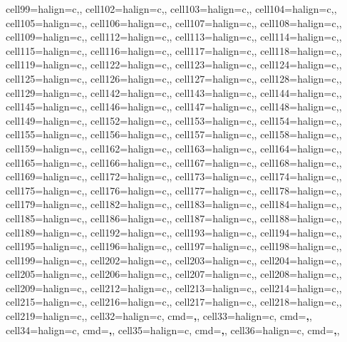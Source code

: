 \documentclass[
  11pt,
  oneside]{article}
\begin{document}
\begin{table}
{{\begin{talltblr}
{cell{9}{9}={}{halign=c,},
cell{10}{2}={}{halign=c,},
cell{10}{3}={}{halign=c,},
cell{10}{4}={}{halign=c,},
cell{10}{5}={}{halign=c,},
cell{10}{6}={}{halign=c,},
cell{10}{7}={}{halign=c,},
cell{10}{8}={}{halign=c,},
cell{10}{9}={}{halign=c,},
cell{11}{2}={}{halign=c,},
cell{11}{3}={}{halign=c,},
cell{11}{4}={}{halign=c,},
cell{11}{5}={}{halign=c,},
cell{11}{6}={}{halign=c,},
cell{11}{7}={}{halign=c,},
cell{11}{8}={}{halign=c,},
cell{11}{9}={}{halign=c,},
cell{12}{2}={}{halign=c,},
cell{12}{3}={}{halign=c,},
cell{12}{4}={}{halign=c,},
cell{12}{5}={}{halign=c,},
cell{12}{6}={}{halign=c,},
cell{12}{7}={}{halign=c,},
cell{12}{8}={}{halign=c,},
cell{12}{9}={}{halign=c,},
cell{14}{2}={}{halign=c,},
cell{14}{3}={}{halign=c,},
cell{14}{4}={}{halign=c,},
cell{14}{5}={}{halign=c,},
cell{14}{6}={}{halign=c,},
cell{14}{7}={}{halign=c,},
cell{14}{8}={}{halign=c,},
cell{14}{9}={}{halign=c,},
cell{15}{2}={}{halign=c,},
cell{15}{3}={}{halign=c,},
cell{15}{4}={}{halign=c,},
cell{15}{5}={}{halign=c,},
cell{15}{6}={}{halign=c,},
cell{15}{7}={}{halign=c,},
cell{15}{8}={}{halign=c,},
cell{15}{9}={}{halign=c,},
cell{16}{2}={}{halign=c,},
cell{16}{3}={}{halign=c,},
cell{16}{4}={}{halign=c,},
cell{16}{5}={}{halign=c,},
cell{16}{6}={}{halign=c,},
cell{16}{7}={}{halign=c,},
cell{16}{8}={}{halign=c,},
cell{16}{9}={}{halign=c,},
cell{17}{2}={}{halign=c,},
cell{17}{3}={}{halign=c,},
cell{17}{4}={}{halign=c,},
cell{17}{5}={}{halign=c,},
cell{17}{6}={}{halign=c,},
cell{17}{7}={}{halign=c,},
cell{17}{8}={}{halign=c,},
cell{17}{9}={}{halign=c,},
cell{18}{2}={}{halign=c,},
cell{18}{3}={}{halign=c,},
cell{18}{4}={}{halign=c,},
cell{18}{5}={}{halign=c,},
cell{18}{6}={}{halign=c,},
cell{18}{7}={}{halign=c,},
cell{18}{8}={}{halign=c,},
cell{18}{9}={}{halign=c,},
cell{19}{2}={}{halign=c,},
cell{19}{3}={}{halign=c,},
cell{19}{4}={}{halign=c,},
cell{19}{5}={}{halign=c,},
cell{19}{6}={}{halign=c,},
cell{19}{7}={}{halign=c,},
cell{19}{8}={}{halign=c,},
cell{19}{9}={}{halign=c,},
cell{20}{2}={}{halign=c,},
cell{20}{3}={}{halign=c,},
cell{20}{4}={}{halign=c,},
cell{20}{5}={}{halign=c,},
cell{20}{6}={}{halign=c,},
cell{20}{7}={}{halign=c,},
cell{20}{8}={}{halign=c,},
cell{20}{9}={}{halign=c,},
cell{21}{2}={}{halign=c,},
cell{21}{3}={}{halign=c,},
cell{21}{4}={}{halign=c,},
cell{21}{5}={}{halign=c,},
cell{21}{6}={}{halign=c,},
cell{21}{7}={}{halign=c,},
cell{21}{8}={}{halign=c,},
cell{21}{9}={}{halign=c,},
cell{3}{2}={}{halign=c, cmd=\bfseries,},
cell{3}{3}={}{halign=c, cmd=\bfseries,},
cell{3}{4}={}{halign=c, cmd=\bfseries,},
cell{3}{5}={}{halign=c, cmd=\bfseries,},
cell{3}{6}={}{halign=c, cmd=\bfseries,},
}
\end{talltblr}}}
\end{table}
\end{document}
